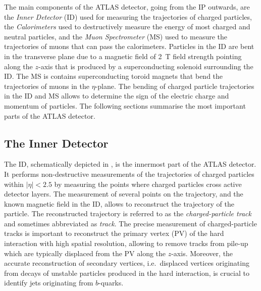 The main components of the ATLAS detector, going from the IP outwards, are the
\emph{Inner Detector} (ID) used for measuring the trajectories of charged
particles, the \emph{Calorimeters} used to destructively measure the energy of
most charged and neutral particles, and the \emph{Muon Spectrometer} (MS) used
to measure the trajectories of muons that can pass the calorimeters. Particles
in the ID are bent in the transverse plane due to a magnetic field of
\SI{2}{\tesla} field strength pointing along the $z$-axis that is produced by a
superconducting solenoid surrounding the ID.  The MS is contains superconducting
toroid magnets that bend the trajectories of muons in the $\eta$-plane. The
bending of charged particle trajectories in the ID and MS allows to determine
the sign of the electric charge and momentum of particles. The following
sections summarise the most important parts of the ATLAS detector.


\subsection{The Inner Detector}

The ID, schematically depicted in , is the
innermost part of the ATLAS detector. It performs non-destructive measurements
of the trajectories of charged particles within $|\eta| < 2.5$ by measuring the
points where charged particles cross active detector layers. The measurement of
several points on the trajectory, and the known magnetic field in the ID, allows
to reconstruct the trajectory of the particle. The reconstructed trajectory is
referred to as the \emph{charged-particle track} and sometimes abbreviated as
\emph{track}. The precise measurement of charged-particle tracks is important to
reconstruct the primary vertex (PV) of the hard interaction with high spatial
resolution, allowing to remove tracks from pile-up which are typically displaced
from the PV along the $z$-axis. Moreover, the accurate reconstruction of
secondary vertices, i.e.\ displaced vertices originating from decays of unstable
particles produced in the hard interaction, is crucial to identify jets
originating from $b$-quarks.%

